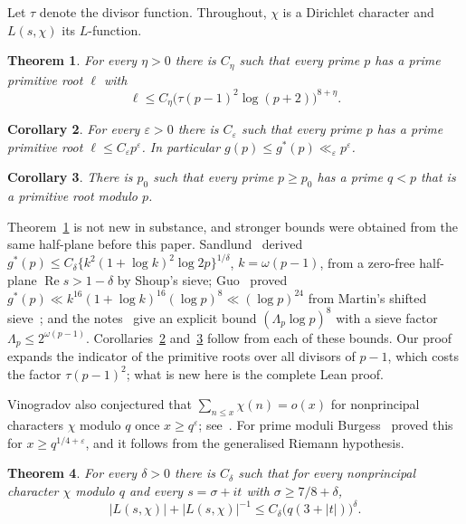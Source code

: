 \documentclass[12pt]{amsart}
\newtheorem{theorem}{Theorem}[section]
\newtheorem{corollary}[theorem]{Corollary}
\theoremstyle{remark}
\renewcommand{\Re}{\operatorname{Re}}
\begin{document}
Let $\tau$ denote the divisor function. Throughout, $\chi$ is a Dirichlet character and
$L(s,\chi)$ its $L$-function.

\begin{theorem}\label{thm:main}
For every $\eta>0$ there is $C_\eta$ such that every prime $p$ has a prime primitive root $\ell$
with
\[
  \ell\le C_\eta\bigl(\tau(p-1)^2\log(p+2)\bigr)^{8+\eta}.
\]
\end{theorem}

\begin{corollary}\label{cor:vinogradov}
For every $\varepsilon>0$ there is $C_\varepsilon$ such that every prime $p$ has a prime primitive
root $\ell\le C_\varepsilon p^\varepsilon$. In particular $g(p)\le g^*(p)\ll_\varepsilon p^\varepsilon$.
\end{corollary}

\begin{corollary}\label{cor:erdos}
There is $p_0$ such that every prime $p\ge p_0$ has a prime $q<p$ that is a primitive root
modulo $p$.
\end{corollary}

Theorem~\ref{thm:main} is not new in substance, and stronger bounds were obtained from the same
half-plane before this paper. Sandlund~\cite{San26} derived
$g^*(p)\le C_\delta\{k^2(1+\log k)^2\log2p\}^{1/\delta}$, $k=\omega(p-1)$, from a zero-free half-plane
$\Re s>1-\delta$ by Shoup's sieve; Guo~\cite[\S6.4]{Guo26} proved
$g^*(p)\ll k^{16}(1+\log k)^{16}(\log p)^8\ll(\log p)^{24}$ from Martin's shifted
sieve~\cite[Prop.~3]{Mar97}; and the notes~\cite{ZL26} give an explicit bound $(\Lambda_p\log p)^8$
with a sieve factor $\Lambda_p\le2^{\omega(p-1)}$. Corollaries~\ref{cor:vinogradov}
and~\ref{cor:erdos} follow from each of these bounds. Our proof expands the indicator of the
primitive roots over all divisors of $p-1$, which costs the factor $\tau(p-1)^2$; what is new here
is the complete Lean proof.

Vinogradov also conjectured that $\sum_{n\le x}\chi(n)=o(x)$ for nonprincipal characters
$\chi$ modulo $q$ once $x\ge q^\varepsilon$; see~\cite{GS18}. For prime moduli Burgess~\cite{Bur62}
proved this for $x\ge q^{1/4+\varepsilon}$, and it follows from the generalised Riemann hypothesis.

\begin{theorem}\label{thm:lindelof}
For every $\delta>0$ there is $C_\delta$ such that for every nonprincipal character $\chi$ modulo
$q$ and every $s=\sigma+it$ with $\sigma\ge7/8+\delta$,
\[
  |L(s,\chi)|+|L(s,\chi)|^{-1}\le C_\delta\bigl(q(3+|t|)\bigr)^\delta.
\]
\end{theorem}
\end{document}

